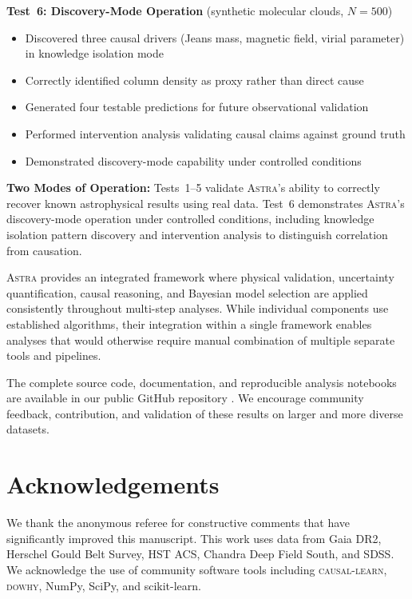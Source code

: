 \documentclass[fleqn,usenatbib]{mnras}
\newcommand{\astra}{\textsc{Astra}\xspace}
\begin{document}
\textbf{Test~6: Discovery-Mode Operation} (synthetic molecular clouds, $N = 500$)
\begin{itemize}
  \item Discovered three causal drivers (Jeans mass, magnetic field, virial parameter) in knowledge isolation mode
  \item Correctly identified column density as proxy rather than direct cause
  \item Generated four testable predictions for future observational validation
  \item Performed intervention analysis validating causal claims against ground truth
  \item Demonstrated discovery-mode capability under controlled conditions
\end{itemize}

\textbf{Two Modes of Operation:}
Tests~1--5 validate \astra's ability to correctly recover known astrophysical results using real data.
Test~6 demonstrates \astra's discovery-mode operation under controlled conditions, including knowledge isolation pattern discovery and intervention analysis to distinguish correlation from causation.

\astra provides an integrated framework where physical validation, uncertainty quantification, causal reasoning, and Bayesian model selection are applied consistently throughout multi-step analyses.
While individual components use established algorithms, their integration within a single framework enables analyses that would otherwise require manual combination of multiple separate tools and pipelines.

The complete source code, documentation, and reproducible analysis notebooks are available in our public GitHub repository \citep{WhiteDey2026}.
We encourage community feedback, contribution, and validation of these results on larger and more diverse datasets.

\section*{Acknowledgements}

We thank the anonymous referee for constructive comments that have significantly improved this manuscript.
This work uses data from Gaia DR2, Herschel Gould Belt Survey, HST ACS, Chandra Deep Field South, and SDSS.
We acknowledge the use of community software tools including \textsc{causal-learn}, \textsc{dowhy}, NumPy, SciPy, and scikit-learn.
\end{document}
